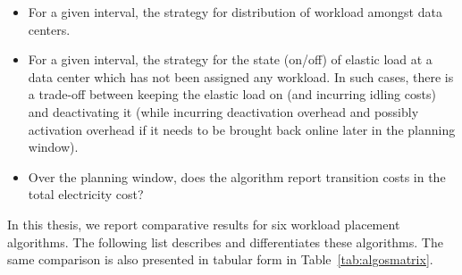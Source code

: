\begin{itemize}
\item For a given interval, the strategy for distribution of workload amongst data centers.
\item For a given interval, the strategy for the state (on/off) of elastic load at a data center which has not been assigned any workload. In such cases, there is a trade-off between keeping the elastic load on (and incurring idling costs) and deactivating it (while incurring deactivation overhead and possibly activation overhead if it needs to be brought back online later in the planning window).
\item Over the planning window, does the algorithm report transition costs in the total electricity cost?
\end{itemize}

In this thesis, we report comparative results for six workload placement algorithms.%
 The following list describes and differentiates these algorithms. The same comparison is also presented in tabular form in Table~\ref{tab:algosmatrix}.

